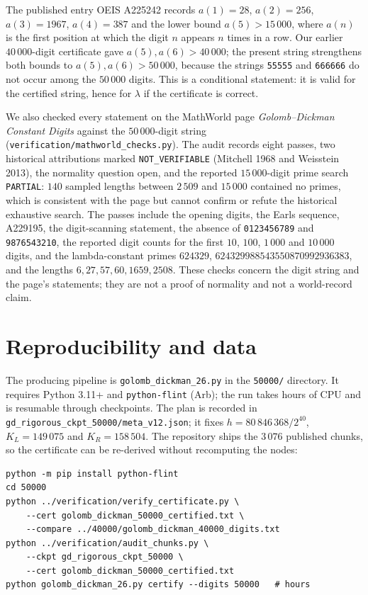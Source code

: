 \documentclass[11pt,a4paper]{article}
\theoremstyle{remark}
\newcommand{\lam}{\lambda}
\begin{document}
The published entry OEIS A225242 \cite{oeisA225242} records
$a(1)=28$, $a(2)=256$, $a(3)=1967$, $a(4)=387$ and the lower bound
$a(5)>15\,000$, where $a(n)$ is the first position at which the digit $n$
appears $n$ times in a row. Our earlier $40\,000$-digit certificate gave
$a(5),a(6)>40\,000$; the present string strengthens both bounds to
$a(5),a(6)>50\,000$, because the strings \texttt{55555} and
\texttt{666666} do not occur among the $50\,000$ digits. This is a
conditional statement: it is valid for the certified string, hence for
$\lam$ if the certificate is correct.

We also checked every statement on the MathWorld page
\emph{Golomb--Dickman Constant Digits} against the $50\,000$-digit string
(\texttt{verification/mathworld\_checks.py}). The audit records eight
passes, two historical attributions marked \texttt{NOT\_VERIFIABLE}
(Mitchell 1968 and Weisstein 2013), the normality question open, and the
reported $15\,000$-digit prime search \texttt{PARTIAL}: $140$ sampled
lengths between $2\,509$ and $15\,000$ contained no primes, which is
consistent with the page but cannot confirm or refute the historical
exhaustive search. The passes include the opening digits, the Earls
sequence, A229195, the digit-scanning statement, the absence of
\texttt{0123456789} and \texttt{9876543210}, the reported digit counts
for the first $10$, $100$, $1\,000$ and $10\,000$ digits, and the
lambda-constant primes $624329$, $624329988543550870992936383$, and the
lengths $6,27,57,60,1659,2508$. These checks concern the digit string
and the page's statements; they are not a proof of normality and not a
world-record claim.

\section{Reproducibility and data}

The producing pipeline is \texttt{golomb\_dickman\_26.py} in the
\texttt{50000/} directory. It requires Python 3.11+ and
\texttt{python-flint} \cite{pythonflint} (Arb); the run takes hours of CPU
and is resumable through checkpoints. The plan is recorded in
\texttt{gd\_rigorous\_ckpt\_50000/meta\_v12.json}; it fixes
$h=80\,846\,368/2^{40}$, $K_L=149\,075$ and $K_R=158\,504$. The
repository ships the $3\,076$ published chunks, so the certificate can be
re-derived without recomputing the nodes:

\begin{lstlisting}
python -m pip install python-flint
cd 50000
python ../verification/verify_certificate.py \
    --cert golomb_dickman_50000_certified.txt \
    --compare ../40000/golomb_dickman_40000_digits.txt
python ../verification/audit_chunks.py \
    --ckpt gd_rigorous_ckpt_50000 \
    --cert golomb_dickman_50000_certified.txt
python golomb_dickman_26.py certify --digits 50000   # hours
\end{lstlisting}
\end{document}
